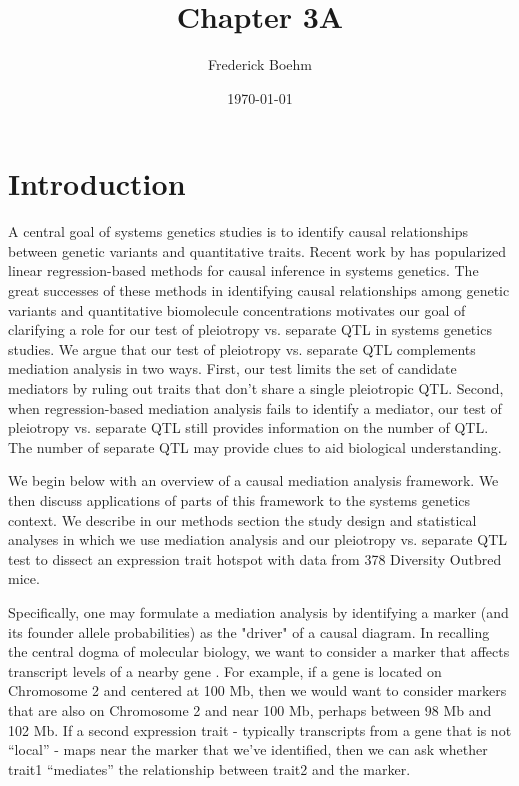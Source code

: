 \documentclass{article}
\title{Chapter 3A}
\author{Frederick Boehm}
\date{\today}
\begin{document}
\doublespacing
\maketitle
\listoftodos
\tableofcontents


\section{Introduction}

A central goal of systems genetics studies is to identify causal relationships between genetic variants and quantitative traits. Recent work by \citet{chick2016defining} has popularized linear regression-based methods for causal inference in systems genetics. The great successes of these methods in identifying causal relationships among genetic variants and quantitative biomolecule concentrations motivates our goal of clarifying a role for our test of pleiotropy vs. separate QTL in systems genetics studies. We argue that our test of pleiotropy vs. separate QTL complements mediation analysis in two ways. First, our test limits the set of candidate mediators by ruling out traits that don't share a single pleiotropic QTL. Second, when regression-based mediation analysis fails to identify a mediator, our test of pleiotropy vs. separate QTL still provides information on the number of QTL. The number of separate QTL may provide clues to aid biological understanding.

We begin below with an overview of a causal mediation analysis framework. We then discuss applications of parts of this framework to the systems genetics context. We describe in our methods section the study design and statistical analyses in which we use mediation analysis and our pleiotropy vs. separate QTL test to dissect an expression trait hotspot with data from 378 Diversity Outbred mice.  






Specifically, one may formulate a mediation analysis by identifying a marker (and its founder allele probabilities) as the "driver" of a causal diagram. In recalling the central dogma of molecular biology, we want to consider a marker that affects transcript levels of a nearby gene \citep{crick1958protein}. For example, if a gene is located on Chromosome 2 and centered at 100 Mb, then we would want to consider markers that are also on Chromosome 2 and near 100 Mb, perhaps between 98 Mb and 102 Mb. If a second expression trait - typically transcripts from a gene that is not “local” - maps near the marker that we’ve identified, then we can ask whether trait1 “mediates” the relationship between trait2 and the marker. 
\end{document}
